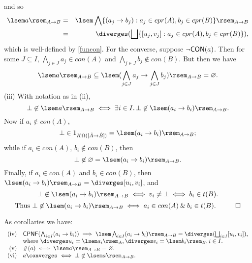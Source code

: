 and so
\begin{eqnarray*}
\lsem a \rsem_{A \rightarrow B} & = & \lsem \bigwedge 
\{ (a_{j} \rightarrow b_{j}) : a_{j} \in cpr(A), b_{j} \in cpr(B) \} \rsem_{A \rightarrow B} \\
& = & \diverges (\bigsqcup \{ [u_{j}, v_{j}] : a_{j} \in cpr(A), b_{j} \in cpr(B) \} ),
\end{eqnarray*} 
which is well-defined by \ref{funcon}.
For the converse, suppose $\neg {\sf CON}(a)$. Then for some $J \subseteq I$,
$\bigwedge_{j \in J}a_{j} \in con(A)$ and $\bigwedge_{j \in J}b_{j} \not\in con(B)$. But then we have
\[ \lsem a \rsem_{A \rightarrow B} \subseteq \lsem 
( \bigwedge_{j \in J}a_{j} \rightarrow \bigwedge_{j \in J}b_{j} ) 
\rsem_{A \rightarrow B} = \varnothing . \]
(iii) With notation as in (ii),
\[ \bot \not\in \lsem a \rsem_{A \rightarrow B} \; \Longleftrightarrow \; \exists i \in I. \, \bot \not\in \lsem (a_{i} \rightarrow b_{i}) \rsem_{A \rightarrow B}. \]
Now if $a_{i} \not\in con(A)$, 
\[ \bot \in 1_{K\Omega ([\hat{A} \rightarrow \hat{B}])} = \lsem (a_{i} \rightarrow b_{i})\rsem_{A \rightarrow B}; \]
while if $a_{i} \in con(A)$, $b_{i} \not\in con(B)$, then
\[ \bot \not\in \varnothing = \lsem (a_{i} \rightarrow b_{i})\rsem_{A \rightarrow B}. \]
Finally, if $a_{i} \in con(A)$ and $b_{i} \in con(B)$, then $\lsem (a_{i} \rightarrow b_{i})\rsem_{A \rightarrow B} = \diverges [u_{i}, v_{i}]$, and
\[ \bot \not\in \lsem (a_{i} \rightarrow b_{i})\rsem_{A \rightarrow B} \;
\Longleftrightarrow \; v_{i} \neq \bot \; \Longleftrightarrow \; b_{i} \in t(B). \]
\[ \mbox{Thus } \bot \not\in \lsem (a_{i} \rightarrow b_{i})\rsem_{A \rightarrow B} \; \Longleftrightarrow \; a_{i} \in con(A) \: \& \: b_{i} \in t(B).  \;\;\; \qed \]

As corollaries we have:
\[ \begin{array}{rl}
\mbox{(iv)} & {\sf CPNF}(\bigwedge_{i \in I}(a_{i} \rightarrow b_{i})) \; \Longrightarrow \; \lsem \bigwedge_{i \in I}(a_{i} \rightarrow b_{i})\rsem_{A \rightarrow B} = \diverges (\bigsqcup_{i \in I}[u_{i}, v_{i}]), \\
&  \mbox{where } \diverges u_{i} = \lsem a_{i} \rsem_{A}, \diverges v_{i} = \lsem b_{i} \rsem_{B}, i \in I. \\
\mbox{(v)} & \#(a) \; \Longleftrightarrow \; \lsem a \rsem_{A \rightarrow B} = \varnothing . \\
\mbox{(vi)} & a \converges \; \Longleftrightarrow \; \bot \not\in \lsem a \rsem_{A \rightarrow B}.
\end{array} \]

